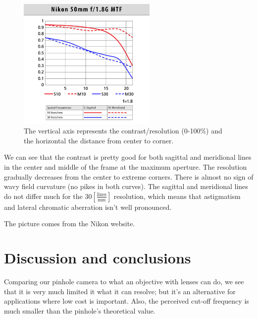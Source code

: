 \documentclass[a4paper, 12pt]{paper}
\begin{document}
\begin{figure}[H]
    \centering
    \includegraphics[width=0.6\textwidth]{img/nikon_mtf}
    \caption{The vertical axis represents the contrast/resolution (0-100\%) and the horizontal the distance from center to corner.}
\label{fig:nikon_MTF}
\end{figure}

We can see that the contrast is pretty good for both sagittal and meridional lines in the center and middle of the frame at the maximum aperture.
The resolution gradually decreases from the center to extreme corners.
There is almost no sign of wavy field curvature (no pikes in both curves).
The sagittal and meridional lines do not differ much for the $30 \left[ \frac{\mbox{lines}}{\mbox{mm}} \right]$ resolution, which means that astigmatism and lateral chromatic aberration isn’t well pronounced.

The picture comes from the Nikon website.

\section{Discussion and conclusions}

Comparing our pinhole camera to what an objective with lenses can do, we see that it is very much limited it what it can resolve; but it's an alternative for applications where low cost is important.
Also, the perceived cut-off frequency is much smaller than the pinhole's theoretical value.
\end{document}
